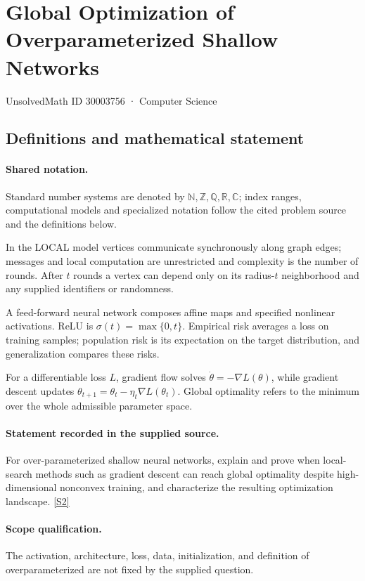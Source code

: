 \documentclass[11pt]{article}
\newcommand{\sref}[2]{\hyperlink{source:#1:#2}{[S#2]}}
\begin{document}
\setcounter{section}{30003755}
\section{Global Optimization of Overparameterized Shallow Networks}\label{30003756}
{\small\sffamily UnsolvedMath ID 30003756 · Computer Science}
\subsection{Definitions and mathematical statement}

\paragraph{Shared notation.}Standard number systems are denoted by $\mathbb N,\mathbb Z,\mathbb Q,\mathbb R,\mathbb C$; index ranges, computational models and specialized notation follow the cited problem source and the definitions below.


In the LOCAL model vertices communicate synchronously along graph edges; messages and local computation are unrestricted and complexity is the number of rounds. After $t$ rounds a vertex can depend only on its radius-$t$ neighborhood and any supplied identifiers or randomness.

A feed-forward neural network composes affine maps and specified nonlinear activations. ReLU is $\sigma(t)=\max\{0,t\}$. Empirical risk averages a loss on training samples; population risk is its expectation on the target distribution, and generalization compares these risks.

For a differentiable loss $L$, gradient flow solves $\dot\theta=-\nabla L(\theta)$, while gradient descent updates $\theta_{t+1}=\theta_t-\eta_t\nabla L(\theta_t)$. Global optimality refers to the minimum over the whole admissible parameter space.
\paragraph{Statement recorded in the supplied source.}
For over-parameterized shallow neural networks, explain and prove when local-search methods such as gradient descent can reach global optimality despite high-dimensional nonconvex training, and characterize the resulting optimization landscape. \sref{30003756}{2}
\paragraph{Scope qualification.}
The activation, architecture, loss, data, initialization, and definition of overparameterized are not fixed by the supplied question.
\end{document}
